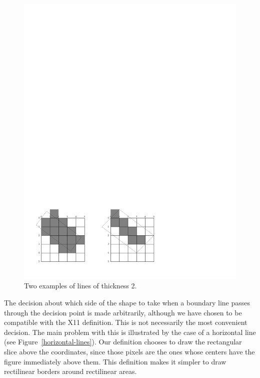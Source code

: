 \begin{figure}
\centerline{\includegraphics{thick-lines}}
\caption{\label{thick-lines} Two examples of lines of thickness 2.}
\end{figure}

The decision about which side of the shape to take when a boundary line passes
through the decision point is made arbitrarily, although we have chosen to be
compatible with the X11 definition.  This is not necessarily the most convenient
decision.  The main problem with this is illustrated by the case of a horizontal
line (see Figure~\ref{horizontal-lines}).  Our definition chooses to draw the
rectangular slice above the coordinates, since those pixels are the ones whose
centers have the figure immediately above them.  This definition makes it
simpler to draw rectilinear borders around rectilinear areas.

